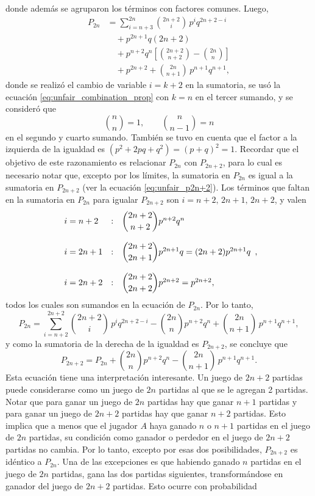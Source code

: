 \documentclass[a4paper]{report}
\begin{document}
donde además se agruparon los términos con factores comunes. Luego,
\begin{align*}
 P_{2n}&=\sum_{i=n+3}^{2n}\binom{2n+2}{i}\,p^iq^{2n+2-i}\\
 &\quad+p^{2n+1}q\left(2n+2\right)\\
 &\quad+p^{n+2}q^{n}\left[\binom{2n+2}{n+2}-\binom{2n}{n}\right]\\
 &\quad+p^{2n+2}+\binom{2n}{n+1}\,p^{n+1}q^{n+1},
\end{align*}
donde se realizó el cambio de variable \(i=k+2\) en la sumatoria, se usó la ecuación \ref{eq:unfair_combination_prop} con \(k=n\) en el tercer sumando, y se consideró que
\[
 \binom{n}{n}=1, \qquad \binom{n}{n-1}=n
\]
en el segundo y cuarto sumando. También se tuvo en cuenta que el factor a la izquierda de la igualdad es \((p^2+2pq+q^2)=(p+q)^2=1\). Recordar que el objetivo de este razonamiento es relacionar \(P_{2n}\) con \(P_{2n+2}\), para lo cual es necesario notar que,  excepto por los límites, la sumatoria en \(P_{2n}\) es igual a la sumatoria en \(P_{2n+2}\) (ver la ecuación \ref{eq:unfair_p2n+2}). Los términos que faltan en la sumatoria en \(P_{2n}\) para igualar \(P_{2n+2}\) son \(i=n+2,\, 2n+1,\, 2n+2\), y valen
\[
 \begin{array}{lll}
  i=n+2 & : & \dbinom{2n+2}{n+2}p^{n+2}q^n \\
  \\
  i=2n+1 & : & \dbinom{2n+2}{2n+1}p^{2n+1}q=(2n+2)p^{2n+1}q\\
  \\
  i=2n+2 & : & \dbinom{2n+2}{2n+2}p^{2n+2}=p^{2n+2},
 \end{array},
\]
todos los cuales son sumandos en la ecuación de \(P_{2n}\). Por lo tanto,
\[
 P_{2n}=\sum_{i=n+2}^{2n+2}\binom{2n+2}{i}\,p^iq^{2n+2-i}-\binom{2n}{n}p^{n+2}q^{n}+\binom{2n}{n+1}\,p^{n+1}q^{n+1},
\]
y como la sumatoria de la derecha de la igualdad es \(P_{2n+2}\), se concluye que
\begin{equation}\label{eq:unfair_p2n_relation}
 P_{2n+2}=P_{2n}+\binom{2n}{n}p^{n+2}q^{n}-\binom{2n}{n+1}\,p^{n+1}q^{n+1}.
\end{equation}
Esta ecuación tiene una interpretación interesante. Un juego de \(2n+2\) partidas puede considerarse como un juego de \(2n\) partidas al que se le agregan 2 partidas. Notar que para ganar un juego de \(2n\) partidas hay que ganar \(n+1\) partidas y para ganar un juego de \(2n+2\) partidas hay que ganar \(n+2\) partidas. Esto implica que a menos que el jugador \(A\) haya ganado \(n\) o \(n+1\) partidas en el juego de \(2n\) partidas, su condición como ganador o perdedor en el juego de \(2n+2\) partidas no cambia. Por lo tanto, excepto por esas dos posibilidades, \(P_{2n+2}\) es idéntico a \(P_{2n}\). Una de las excepciones es que habiendo ganado \(n\) partidas en el juego de \(2n\) partidas, gana las dos partidas siguientes, transformándose en ganador del juego de \(2n+2\) partidas. Esto ocurre con probabilidad
\end{document}
